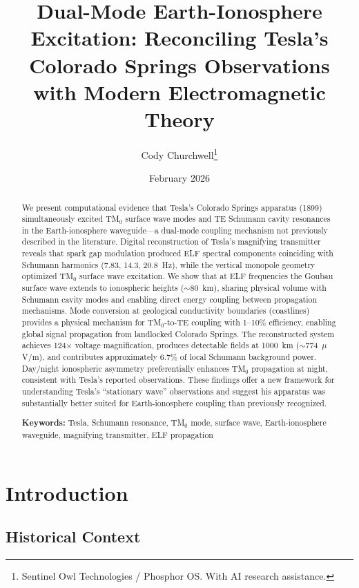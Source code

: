 \documentclass[12pt,a4paper]{article}
\title{Dual-Mode Earth-Ionosphere Excitation: Reconciling Tesla's Colorado Springs Observations with Modern Electromagnetic Theory}
\author{Cody Churchwell\thanks{Sentinel Owl Technologies / Phosphor OS. With AI research assistance.}}
\date{February 2026}
\begin{document}
\maketitle

\begin{abstract}
We present computational evidence that Tesla's Colorado Springs apparatus (1899) simultaneously excited TM$_0$ surface wave modes and TE Schumann cavity resonances in the Earth-ionosphere waveguide---a dual-mode coupling mechanism not previously described in the literature. Digital reconstruction of Tesla's magnifying transmitter reveals that spark gap modulation produced ELF spectral components coinciding with Schumann harmonics (7.83, 14.3, 20.8~Hz), while the vertical monopole geometry optimized TM$_0$ surface wave excitation. We show that at ELF frequencies the Goubau surface wave extends to ionospheric heights ($\sim$80~km), sharing physical volume with Schumann cavity modes and enabling direct energy coupling between propagation mechanisms. Mode conversion at geological conductivity boundaries (coastlines) provides a physical mechanism for TM$_0$-to-TE coupling with 1--10\% efficiency, enabling global signal propagation from landlocked Colorado Springs. The reconstructed system achieves 124$\times$ voltage magnification, produces detectable fields at 1000~km ($\sim$774~$\mu$V/m), and contributes approximately 6.7\% of local Schumann background power. Day/night ionospheric asymmetry preferentially enhances TM$_0$ propagation at night, consistent with Tesla's reported observations. These findings offer a new framework for understanding Tesla's ``stationary wave'' observations and suggest his apparatus was substantially better suited for Earth-ionosphere coupling than previously recognized.

\medskip\noindent
\textbf{Keywords:} Tesla, Schumann resonance, TM$_0$ mode, surface wave, Earth-ionosphere waveguide, magnifying transmitter, ELF propagation
\end{abstract}

\section{Introduction}

\subsection{Historical Context}
\end{document}
